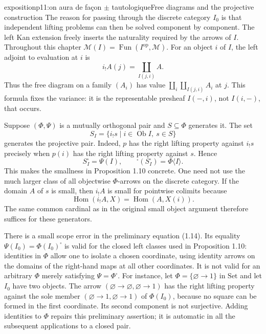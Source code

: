 \begin{dcomment}{exposition}{p11:on aura de façon $\pm$ tautologique}{Free diagrams and the projective construction}
The reason for passing through the discrete category $I_0$ is that independent lifting problems can then be solved component by component. The left Kan extension freely inserts the naturality required by the arrows of $I$. Throughout this chapter $\mathcal M(I)=\operatorname{Fun}(I^{\mathrm{op}},\mathcal M)$. For an object $i$ of $I$, the left adjoint to evaluation at $i$ is
\[
 i_!A(j)=\coprod_{I(j,i)} A.
\]
Thus the free diagram on a family $(A_i)$ has value $\coprod_i\coprod_{I(j,i)}A_i$ at $j$. This formula fixes the variance: it is the representable presheaf $I(-,i)$, not $I(i,-)$, that occurs.

Suppose $(\Phi,\Psi)$ is a mutually orthogonal pair and $S\subseteq\Phi$ generates it. The set
\[
 S_I=\{i_!s\mid i\in\operatorname{Ob}I,\ s\in S\}
\]
generates the projective pair. Indeed, $p$ has the right lifting property against $i_!s$ precisely when $p(i)$ has the right lifting property against $s$. Hence
\[
 S_I^{\square}=\Psi(I),\qquad
 {}^{\square}(S_I^{\square})=\Phi\langle I\rangle.
\]
This makes the smallness in Proposition 1.10 concrete. One need not use the much larger class of all objectwise $\Phi$-arrows on the discrete category. If the domain $A$ of $s$ is small, then $i_!A$ is small for pointwise colimits because
\[
\operatorname{Hom}(i_!A,X)=\operatorname{Hom}(A,X(i)).
\]
The same common cardinal as in the original small object argument therefore suffices for these generators.

There is a small scope error in the preliminary equation (1.14). Its equality $\Psi(I_0)=\Phi(I_0)^{\square}$ is valid for the closed left classes used in Proposition 1.10: identities in $\Phi$ allow one to isolate a chosen coordinate, using identity arrows on the domains of the right-hand maps at all other coordinates. It is not valid for an arbitrary $\Phi$ merely satisfying $\Psi=\Phi^{\square}$. For instance, let $\Phi=\{\varnothing\to1\}$ in $\mathrm{Set}$ and let $I_0$ have two objects. The arrow $(\varnothing\to\varnothing,\varnothing\to1)$ has the right lifting property against the sole member $(\varnothing\to1,\varnothing\to1)$ of $\Phi(I_0)$, because no square can be formed in the first coordinate. Its second component is not surjective. Adding identities to $\Phi$ repairs this preliminary assertion; it is automatic in all the subsequent applications to a closed pair.


\end{dcomment}
